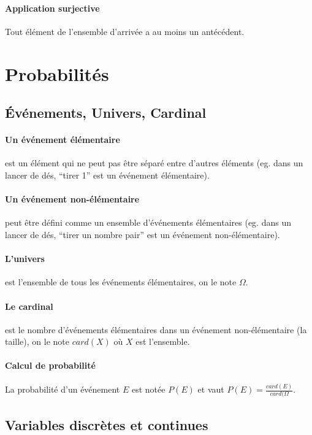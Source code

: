 \documentclass[10pt,a4paper,french]{article}
\begin{document}
\paragraph{Application surjective}
Tout élément de l'ensemble d'arrivée a au moins un antécédent.

\section{Probabilités}

\subsection{Événements, Univers, Cardinal}

\paragraph{Un événement élémentaire} est un élément qui ne peut pas être séparé entre d'autres éléments (eg. dans un lancer de dés, ``tirer 1'' est un événement élémentaire).

\paragraph{Un événement non-élémentaire} peut être défini comme un ensemble d'événements élémentaires (eg. dans un lancer de dés, ``tirer un nombre pair'' est un événement non-élémentaire).

\paragraph{L'univers} est l'ensemble de tous les événements élémentaires, on le note $\Omega$.

\paragraph{Le cardinal} est le nombre d'événements élémentaires dans un événement non-élémentaire (la taille), on le note $card(X)$ où $X$ est l'ensemble.

\paragraph{Calcul de probabilité} La probabilité d'un événement $E$ est notée $P(E)$ et vaut $P(E) = \frac{card(E)}{card(\Omega}$.

\hrulefill

\subsection{Variables discrètes et continues}
\end{document}
